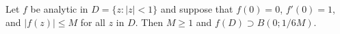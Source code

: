 Let $f$ be analytic in $D = \{z : |z| < 1\}$ and suppose that $f(0) = 0$, $f'(0) = 1$, and $|f(z)| \leq M$ for all $z$ in $D$. Then $M \geq 1$ and $f(D) \supset B(0; 1/6M)$.
